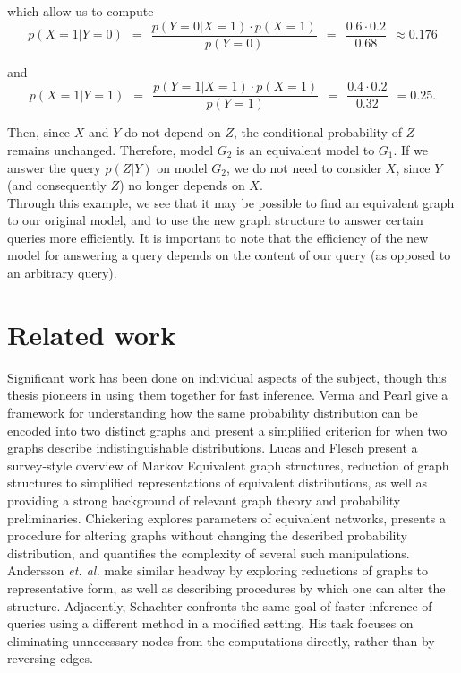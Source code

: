 which allow us to compute 
$$
	p(X = 1 | Y = 0) \ \ = \ \ \frac{p(Y = 0 | X=1) \cdot p(X=1)}{p(Y=0)} \ \ = \ \ \frac{0.6 \cdot 0.2}{0.68} \ \ \approx 0.176
$$

and
$$
	p(X = 1 | Y = 1) \ \  = \ \  \frac{p(Y=1 | X=1) \cdot p(X=1)}{p(Y=1)} \ \ = \ \ \frac{0.4 \cdot 0.2}{0.32} \ \ = 0.25.
$$

\null \quad \quad Then, since $X$ and $Y$ do not depend on $Z$, the conditional probability of $Z$ remains unchanged. Therefore, model $G_{2}$ is an equivalent model to $G_{1}$. If we answer the query $p(Z|Y)$ on model $G_{2}$, we do not need to consider $X$, since $Y$ (and consequently $Z$) no longer depends on $X$. \\
\null \quad \quad Through this example, we see that it may be possible to find an equivalent graph to our original model, and to use the new graph structure to answer certain queries more efficiently. It is important to note that the efficiency of the new model for answering a query depends on the content of our query (as opposed to an arbitrary query). 


\section{Related work}
\null \quad \quad Significant work has been done on individual aspects of the subject, though this thesis pioneers in using them together for fast inference. Verma and Pearl\cite{verma} give a framework for understanding how the same probability distribution can be encoded into two distinct graphs and present a simplified criterion for when two graphs describe indistinguishable distributions. Lucas and Flesch\cite{flesch} present a survey-style overview of Markov Equivalent graph structures, reduction of graph structures to simplified representations of equivalent distributions, as well as providing a strong background of relevant graph theory and probability preliminaries. Chickering\cite{chickering} explores parameters of equivalent networks, presents a procedure for altering graphs without changing the described probability distribution, and quantifies the complexity of several such manipulations. Andersson \textit{et. al.}\cite{andersson} make similar headway by exploring reductions of graphs to representative form, as well as describing procedures by which one can alter the structure. \newline 
\null \quad \quad Adjacently, Schachter\cite{schachter} confronts the same goal of faster inference of queries using a different method in a modified setting. His task focuses on eliminating unnecessary nodes from the computations directly, rather than by reversing edges. 

